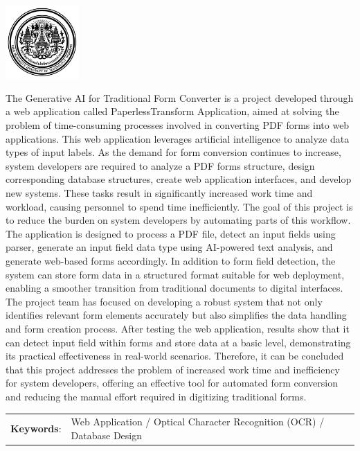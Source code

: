 \documentclass[12pt,oneside,openright,a4paper]{cpe-english-project}
\begin{document}
\pdfstringdefDisableCommands{\let\MakeUppercase\relax}
\begin{center}
  \includegraphics[width=2.8cm]{logo02.jpg}
\end{center}
\vspace*{-1cm}

\maketitlepage
\makesignaturepage 

\abstract

\setlength{\parindent}{15pt} The Generative AI for Traditional Form Converter is a project developed through a web application called PaperlessTransform Application, aimed at solving the problem of time-consuming processes involved in converting PDF forms into web applications. This web application leverages artificial intelligence to analyze data types of input labels. As the demand for form conversion continues to increase, system developers are required to analyze a PDF forms structure, design corresponding database structures, create web application interfaces, and develop new systems. These tasks result in significantly increased work time and workload, causing personnel to spend time inefficiently. The goal of this project is to reduce the burden on system developers by automating parts of this workflow. The application is designed to process a PDF file, detect an input fields using parser,  generate an input field data type using AI-powered text analysis, and generate web-based forms accordingly. In addition to form field detection, the system can store form data in a structured format suitable for web deployment, enabling a smoother transition from traditional documents to digital interfaces. The project team has focused on developing a robust system that not only identifies relevant form elements accurately but also simplifies the data handling and form creation process. After testing the web application, results show that it can detect input field within forms and store data at a basic level, demonstrating its practical effectiveness in real-world scenarios. Therefore, it can be concluded that this project addresses the problem of increased work time and inefficiency for system developers, offering an effective tool for automated form conversion and reducing the manual effort required in digitizing traditional forms.
\begin{flushleft}
\begin{tabular*}{\textwidth}{@{}lp{}}
\textbf{Keywords}: & Web Application / Optical Character Recognition (OCR) / Database Design

\end{tabular*}
\end{flushleft}
\endabstract
\end{document}
